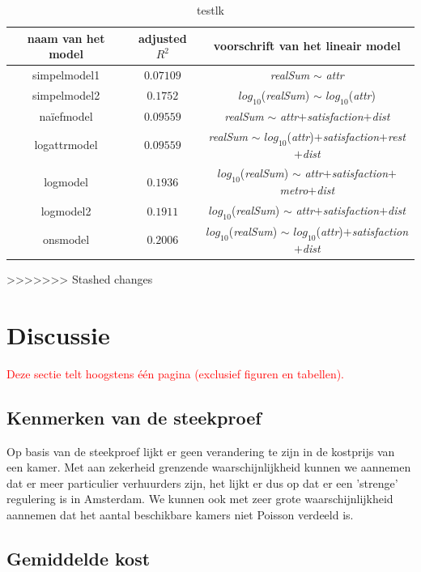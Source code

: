 \documentclass[a4paper]{kulakarticle}
\newcommand{\rood}[1]{\textcolor{red}{#1}}
\begin{document}
	\begin{table}[h]
		\begin{tabular}{c|c|c}
		\centering
		naam van het model & adjusted $R^2$ & voorschrift van het lineair model \\
		\hline
		 simpelmodel1 & $0.07109$ & \textit{realSum} $\sim$ \textit{attr}\\
		 simpelmodel2 &$0.1752$ & $log_{10}$(\textit{realSum}) $\sim$ $log_{10}$(\textit{attr}) \\
		naïefmodel & $0.09559$& \textit{realSum} $\sim$ \textit{attr}$+$\textit{satisfaction}$+$\textit{dist}\\
		 logattrmodel &$0.09559$ & \textit{realSum} $\sim$ $log_{10}$(\textit{attr})$+$\textit{satisfaction}$+$\textit{rest}$+$\textit{dist}\\
		 logmodel &$0.1936$ & $log_{10}$(\textit{realSum}) $\sim$ \textit{attr}$+$\textit{satisfaction}$+$\textit{metro}$+$\textit{dist}\\
		 logmodel2 &$0.1911$ & $log_{10}$(\textit{realSum}) $\sim$ \textit{attr}$+$\textit{satisfaction}$+$\textit{dist}\\
		  onsmodel &$0.2006$ & $log_{10}$(\textit{realSum}) $\sim$ $log_{10}$(\textit{attr})$+$\textit{satisfaction}$+$\textit{dist}\\
		\end{tabular}
		\label{rsq}
		\caption{testlk}
	\end{table}
	
	
>>>>>>> Stashed changes
	
	\section{Discussie}
	\rood{Deze sectie telt hoogstens één pagina (exclusief figuren en tabellen).}
	\subsection{Kenmerken van de steekproef}
Op basis van de steekproef lijkt er geen verandering te zijn in de kostprijs van een kamer. Met aan zekerheid grenzende waarschijnlijkheid kunnen we aannemen dat er meer particulier verhuurders zijn, het lijkt er dus op dat er een 'strenge' regulering is in Amsterdam. We kunnen ook met zeer grote waarschijnlijkheid aannemen dat het aantal beschikbare kamers niet Poisson verdeeld is.
	
	\subsection{Gemiddelde kost}
	
\end{document}
